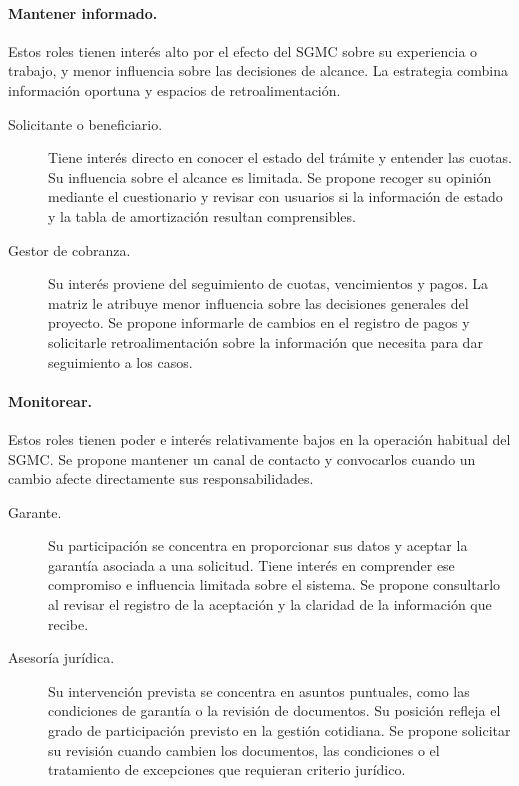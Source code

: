 \documentclass[11pt,a4paper]{article}
\begin{document}
\paragraph{Mantener informado.}
Estos roles tienen interés alto por el efecto del SGMC sobre su
experiencia o trabajo, y menor influencia sobre las decisiones de
alcance. La estrategia combina información oportuna y espacios de
retroalimentación.

\begin{description}
  \item[Solicitante o beneficiario.]
  Tiene interés directo en conocer el estado del trámite y entender
  las cuotas. Su influencia sobre el alcance es limitada. Se propone
  recoger su opinión mediante el cuestionario y revisar con usuarios
  si la información de estado y la tabla de amortización resultan
  comprensibles.

  \item[Gestor de cobranza.]
  Su interés proviene del seguimiento de cuotas, vencimientos y
  pagos. La matriz le atribuye menor influencia sobre las decisiones
  generales del proyecto. Se propone informarle de cambios en el
  registro de pagos y solicitarle retroalimentación sobre la
  información que necesita para dar seguimiento a los casos.
\end{description}

\paragraph{Monitorear.}
Estos roles tienen poder e interés relativamente bajos en la
operación habitual del SGMC. Se propone mantener un canal de
contacto y convocarlos cuando un cambio afecte directamente sus
responsabilidades.

\begin{description}
  \item[Garante.]
  Su participación se concentra en proporcionar sus datos y aceptar
  la garantía asociada a una solicitud. Tiene interés en comprender
  ese compromiso e influencia limitada sobre el sistema. Se propone
  consultarlo al revisar el registro de la aceptación y la claridad
  de la información que recibe.

  \item[Asesoría jurídica.]
  Su intervención prevista se concentra en asuntos puntuales, como
  las condiciones de garantía o la revisión de documentos. Su
  posición refleja el grado de participación previsto en la gestión
  cotidiana. Se propone solicitar su revisión cuando cambien los
  documentos, las condiciones o el tratamiento de excepciones que
  requieran criterio jurídico.
\end{description}
\end{document}
